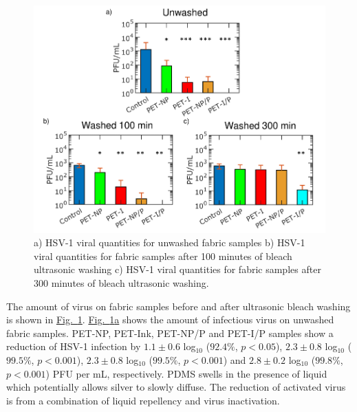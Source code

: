 \documentclass[journal=jacsat,manuscript=article]{achemso}
\newcommand{\figref}[2][]{\hyperref[#2]{Fig.~\ref{#2}#1}}
\begin{document}
\begin{figure}[H]
       \centering
    \includegraphics[width= \linewidth]{Figures/fig_virus.pdf}
\caption[Virus]{a) HSV-1 viral quantities for unwashed fabric samples b) HSV-1 viral quantities for fabric samples after 100 minutes of bleach ultrasonic washing c) HSV-1 viral quantities for fabric samples after 300 minutes of bleach ultrasonic washing. %
}

\label{fig:virus}
\end{figure}


The amount of virus on fabric samples before and after ultrasonic bleach washing is shown in \figref{fig:virus}. \figref[a]{fig:virus} shows the amount of infectious virus on unwashed fabric samples. PET-NP, PET-Ink, PET-NP/P and PET-I/P samples show a reduction of HSV-1 infection by $1.1 \pm 0.6$ log$_{10}$ ($92.4 %
\%$, $p < 0.05$), $2.3 \pm 0.8$ log$_{10}$ ($99.5 %
\%$, $p < 0.001$), $2.3 \pm 0.8$  log$_{10}$ ($99.5 %
\%$, $p < 0.001$) and $2.8 \pm 0.2$ log$_{10}$ ($99.8 %
\%$, $p < 0.001$) PFU per mL, respectively. 
PDMS swells in the presence of liquid which potentially allows silver to slowly diffuse.\cite{bian_2021,faupel:1998,ahmad_2021,dastjerdi:2009}
The reduction of activated virus is from a combination of liquid repellency and virus inactivation.  
\end{document}
